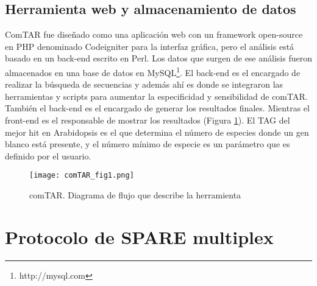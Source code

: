 \subsection{Herramienta web y almacenamiento de datos}
ComTAR fue diseñado como una aplicación web con un framework open-source en PHP denominado Codeigniter para la interfaz gráfica, pero el análisis está basado en un back-end escrito en Perl.
Los datos que surgen de ese análisis fueron almacenados en una base de datos en MySQL\footnote{http://mysql.com}.
El back-end es el encargado de realizar la búsqueda de secuencias y además ahí es donde se integraron las herramientas y scripts para aumentar la especificidad y sensibilidad de comTAR. 
También el back-end es el encargado de generar los resultados finales.
Mientras el front-end es el responsable de mostrar los resultados (Figura \ref{fig:comTAR_fig1}).
El TAG del mejor hit en Arabidopsis es el que determina el número de especies donde un gen blanco está presente, y el número mínimo de especie es un parámetro que es definido por el usuario.

\begin{figure}[htbp!] 
    \centering    
    \texttt{[image: comTAR\_fig1.png]}
    \caption[comTAR. Diagrama de flujo]{comTAR. Diagrama de flujo que describe la herramienta}
    \label{fig:comTAR_fig1}
\end{figure}



\section{Protocolo de SPARE multiplex}

